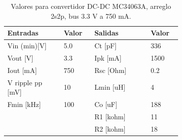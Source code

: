 
\begin{table}[h]
    \centering
    \begin{tabular}{p{0.25\linewidth}p{0.1\linewidth}p{0.25\linewidth}p{0.1\linewidth}}
    \hline
    \textbf{Entradas} & \textbf{Valor} & \textbf{Salidas} & \textbf{Valor} \\ \hline
    Vin (min)[V] & 5.0 & Ct [pF] & 336 \\
    Vout [V] & 3.3 & Ipk [mA] & 1500 \\
    Iout [mA] & 750 & Rsc [Ohm] & 0.2 \\
    V ripple pp [mV] & 10 & Lmin [uH] & 4 \\
    Fmin [kHz] & 100 & Co [uF] & 188 \\
    ~ & ~ & R1 [kohm] & 11 \\
    ~ & ~ & R2 [kohm] & 18 \\ \hline
    \end{tabular}
\caption{Valores para convertidor DC-DC MC34063A, arreglo 2s2p, bus 3.3 V a 750 mA.}
\label{tab:valores_33_2s2p}
\end{table}


